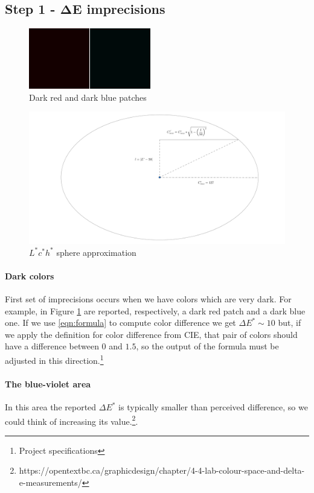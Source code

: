 \documentclass[twocolumn,a4paper]{article}
\begin{document}
\subsection{Step 1 - $\mathbf{\Delta E}$ imprecisions}\label{subsec:imprec}
\begin{figure}[H]
	\centering
	\includegraphics[scale=0.5]{images/darkred_darkblue.png}
	\caption{Dark red and dark blue patches}
	\label{fig:darkredblue}
\end{figure}
\begin{figure}
	\centering
	\includegraphics[width=\linewidth]{images/ellipsis.png}
	\caption{$L^*c^*h^*$ sphere approximation}
	\label{fig:sphere_approx}
\end{figure}
\paragraph{Dark colors} First set of imprecisions occurs when we have colors which are very dark. For example, in Figure \ref{fig:darkredblue} are reported, respectively, a dark red patch and a dark blue one. If we use \ref{eqn:formula} to compute color difference we get $\Delta E^{*} \sim 10$ but, if we apply the definition for color difference from CIE, that pair of colors should have a difference between $0$ and $1.5$, so the output of the formula must be adjusted in this direction.\footnote{Project specifications}
\paragraph{The blue-violet area} In this area the reported $\Delta E^*$ is typically smaller than perceived difference, so we could think of increasing its value.\footnote{\label{note:opentext} https://opentextbc.ca/graphicdesign/chapter/4-4-lab-colour-space-and-delta-e-measurements/}.
\end{document}

